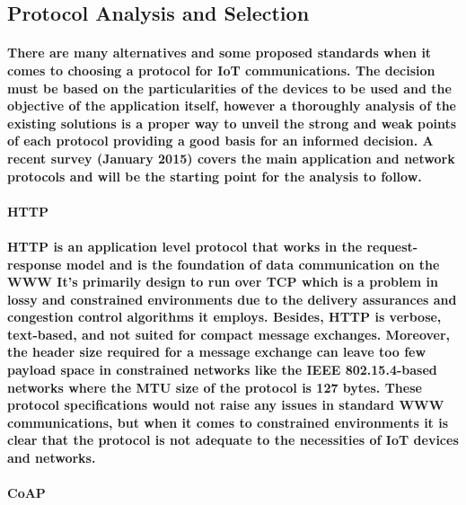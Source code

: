 \subsection{Protocol Analysis and Selection}

\paragraph{
	There are many alternatives and some proposed standards when it comes to choosing a protocol for \ac{IoT} communications. The decision must be based on the particularities of the devices to be used and the objective of the application itself, however a thoroughly analysis of the existing solutions is a proper way to unveil the strong and weak points of each protocol providing a good basis for an informed decision. A recent survey (January 2015) \cite{Al-Fuqaha2015} covers the main application and network protocols and will be the starting point for the analysis to follow.
}

\paragraph{\textbf{\ac{HTTP}}}
\paragraph{
	\ac{HTTP} is an application level protocol that works in the request-response model and is the foundation of data communication on the \ac{WWW} It's primarily design to run over \ac{TCP} which is a problem in lossy and constrained environments due to the delivery assurances and congestion control algorithms it employs. Besides, {HTTP} is verbose, text-based, and not suited for compact message exchanges. Moreover, the header size required for a message exchange can leave too few payload space in constrained networks like the IEEE 802.15.4-based networks where the \ac{MTU} size of the protocol is 127 bytes. These protocol specifications would not raise any issues in standard \ac{WWW} communications, but when it comes to constrained environments it is clear that the protocol is not adequate to the necessities of \ac{IoT} devices and networks.
}

\paragraph{\textbf{\ac{CoAP}}}
